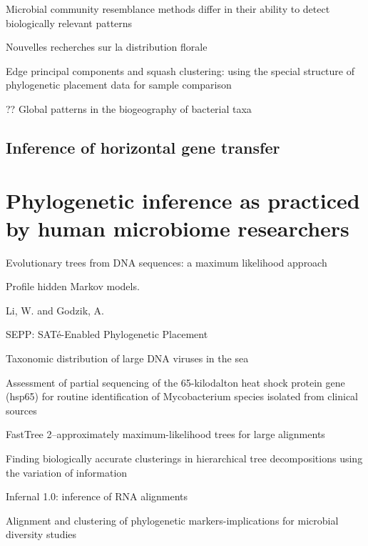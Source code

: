 \documentclass{amsart}
\begin{document}
\cite{kuczynski2010microbial}
Microbial community resemblance methods differ in their ability to detect biologically relevant patterns


\cite{jaccard1908nouvelles}
Nouvelles recherches sur la distribution florale


\cite{matsen2013edge}
Edge principal components and squash clustering: using the special structure of phylogenetic placement data for sample comparison

\cite{PurdomAnalyzingDataGraphs08}


\cite{nemergut2011global}
?? Global patterns in the biogeography of bacterial taxa

\subsection{Inference of horizontal gene transfer}




\section{Phylogenetic inference as practiced by human microbiome researchers}

\cite{felsenstein1981evolutionary}
{Evolutionary trees from DNA sequences: a maximum likelihood approach}

\cite{eddy1998profile}
Profile hidden Markov models.

\cite{li2006cdhit}
Li, W.  and Godzik, A.
\cite{edgar2010usearch}

\cite{mirarabsepp}
{SEPP: SAT{\'e}-Enabled Phylogenetic Placement}

\cite{monierEaLargeViruses08}
{Taxonomic distribution of large DNA viruses in the sea}


\cite{huson2007megan}

\cite{mcnabb2004hsp65}
{{A}ssessment of partial sequencing of the 65-kilodalton heat shock protein gene (hsp65) for routine identification of {M}ycobacterium species isolated from clinical sources}

\cite{price2010fasttree}
{FastTree 2--approximately maximum-likelihood trees for large alignments}

\cite{navlakha2009finding}
Finding biologically accurate clusterings in hierarchical tree decompositions using the variation of information

\cite{nawrocki2009infernal}
Infernal 1.0: inference of RNA alignments

\cite{white2010alignment}
Alignment and clustering of phylogenetic markers-implications for microbial diversity studies
\end{document}
